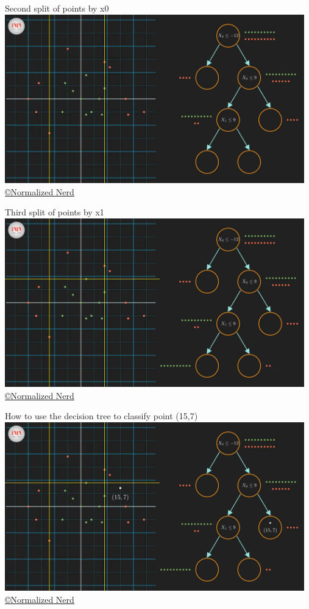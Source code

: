 \documentclass[handout, 10pt]{beamer}
\begin{document}
\begin{frame}{Second split of points by x0}
\hspace*{-1cm}\includegraphics[width=13cm]{dt/_3-3 screenshot}
{\tiny \href{https://www.youtube.com/watch?v=ZVR2Way4nwQ}{ \copyright Normalized Nerd}}
\end{frame}

\begin{frame}{Third split of points by x1}
\hspace*{-1cm}\includegraphics[width=13cm]{dt/_3-19 screenshot}
{\tiny \href{https://www.youtube.com/watch?v=ZVR2Way4nwQ}{ \copyright Normalized Nerd}}
\end{frame}

\begin{frame}{How to use the decision tree to classify point (15,7)}
\hspace*{-1cm}\includegraphics[width=13cm]{dt/_3-54 screenshot}
{\tiny \href{https://www.youtube.com/watch?v=ZVR2Way4nwQ}{ \copyright Normalized Nerd}}
\end{frame}
\end{document}
